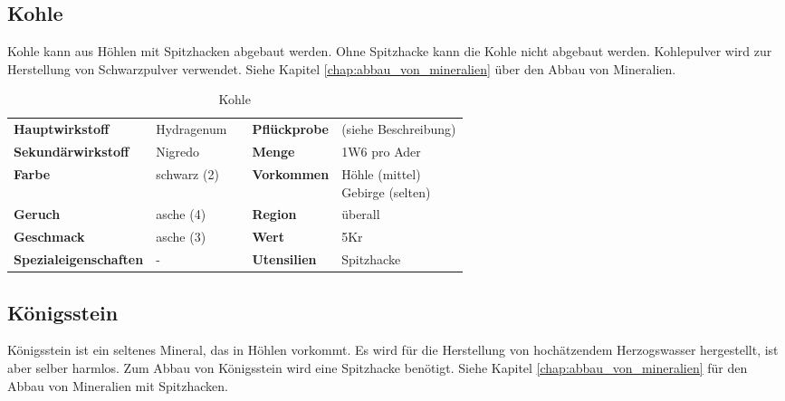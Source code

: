 \subsection{Kohle}
\label{chap:kohle}
Kohle kann aus Höhlen mit Spitzhacken abgebaut werden. Ohne Spitzhacke kann die Kohle nicht abgebaut werden. Kohlepulver wird zur Herstellung von Schwarzpulver verwendet. Siehe Kapitel \ref{chap:abbau_von_mineralien} über den Abbau von Mineralien.

\begin{table}[H] 
\begin{center} 
\begin{tabular}{|l|l|p{1cm}|l|l|} 
  	\cline{1-2} \cline{4-5} 
  	\textbf{Hauptwirkstoff} & Hydragenum && \textbf{Pflückprobe} & (siehe Beschreibung) \\ \cline{1-2} \cline{4-5} 
  	\textbf{Sekundärwirkstoff} & Nigredo && \textbf{Menge} & 1W6 pro Ader \\ \cline{1-2} \cline{4-5} 
  	\textbf{Farbe} & schwarz (2) && \textbf{Vorkommen} & \brcell{Höhle (mittel) \\ Gebirge (selten)} \\ \cline{1-2} \cline{4-5} 
  	\textbf{Geruch} & asche (4) && \textbf{Region} & überall \\ \cline{1-2} \cline{4-5} 
  	\textbf{Geschmack} & asche (3) && \textbf{Wert} & 5Kr \\ \cline{1-2} \cline{4-5} 
  	\textbf{Spezialeigenschaften} & - && \textbf{Utensilien} & Spitzhacke \\ \cline{1-2} \cline{4-5} 
\end{tabular} 
\end{center} 
\caption{Kohle} 
\label{tab:kohle} 
\end{table}


\subsection{Königsstein}
\label{chap:koenigsstein}
Königsstein ist ein seltenes Mineral, das in Höhlen vorkommt. Es wird für die Herstellung von hochätzendem Herzogswasser hergestellt, ist aber selber harmlos. Zum Abbau von Königsstein wird eine Spitzhacke benötigt. Siehe Kapitel \ref{chap:abbau_von_mineralien} für den Abbau von Mineralien mit Spitzhacken.

